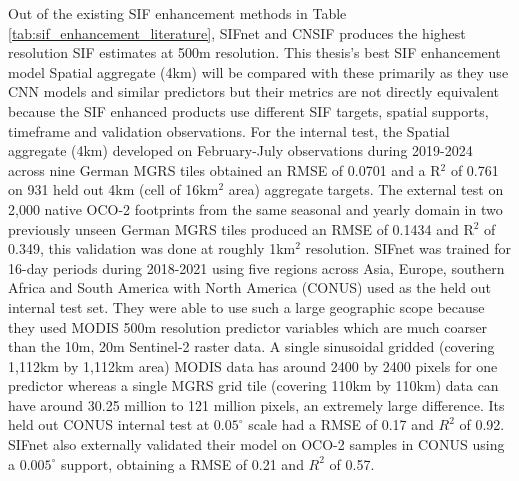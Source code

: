 Out of the existing SIF enhancement methods in Table \ref{tab:sif_enhancement_literature}, SIFnet \cite{gensheimer2022convolutional} and CNSIF \cite{du2025cnsif} produces the highest resolution SIF estimates at 500m resolution. This thesis's best SIF enhancement model Spatial aggregate (4km) will be compared with these primarily as they use CNN models and similar predictors but their metrics are not directly equivalent because the SIF enhanced products use different SIF targets, spatial supports, timeframe and validation observations. For the internal test, the Spatial aggregate (4km) developed on February-July observations during 2019-2024 across nine German MGRS tiles obtained an RMSE of 0.0701 and a R$^2$ of 0.761 on 931 held out 4km (cell of 16km$^2$ area) aggregate targets. The external test on 2,000 native OCO-2 footprints from the same seasonal and yearly domain in two previously unseen German MGRS tiles produced an RMSE of 0.1434 and R$^2$ of 0.349, this validation was done at roughly 1km$^2$ resolution. SIFnet was trained for 16-day periods during 2018-2021 using five regions across Asia, Europe, southern Africa and South America with North America (CONUS) used as the held out internal test set. They were able to use such a large geographic scope because they used MODIS 500m resolution predictor variables which are much coarser than the 10m, 20m Sentinel-2 raster data. A single sinusoidal gridded (covering 1,112km by 1,112km area) MODIS data has around 2400 by 2400 pixels for one predictor whereas a single MGRS grid tile (covering 110km by 110km) data can have around 30.25 million to 121 million pixels, an extremely large difference. Its held out CONUS internal test at $0.05^{\circ}$ scale had a RMSE of 0.17 and $R^2$ of 0.92. SIFnet also externally validated their model on OCO-2 samples in CONUS using a $0.005^{\circ}$ support, obtaining a RMSE of 0.21 and $R^2$ of 0.57. 

